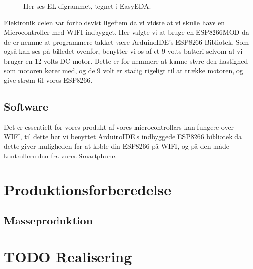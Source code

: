 \documentclass[11pt]{article}
\begin{document}
\begin{figure}[htbp]
    \centering
    \caption{Her ses EL-digrammet, tegnet i EasyEDA. }
    \end{figure}

Elektronik delen var forholdsvist ligefrem da vi vidste at vi skulle have en Microcontroller med WIFI indbygget. Her valgte vi at bruge en ESP8266MOD da de er nemme at programmere takket være ArduinoIDE's ESP8266 Bibliotek. Som også kan ses på billedet ovenfor, benytter vi os af et 9 volts batteri selvom at vi bruger en 12 volts DC motor. Dette er for nemmere at kunne styre den hastighed som motoren kører med, og de 9 volt er stadig rigeligt til at trække motoren, og give strøm til vores ESP8266.


\subsection{Software}
Det er essentielt for vores produkt af vores microcontrollers kan fungere over WIFI, til dette har vi benyttet ArduinoIDE's indbyggede ESP8266 bibliotek da dette giver muligheden for at koble din ESP8266 på WIFI, og på den måde kontrollere den fra vores Smartphone.

\section{Produktionsforberedelse}
\label{sec:orge880538}
\subsection{Masseproduktion}
\label{sec:orge66eada}
\section{{\bfseries\sffamily TODO} Realisering}
\label{sec:orgd4c9e64}
\end{document}
